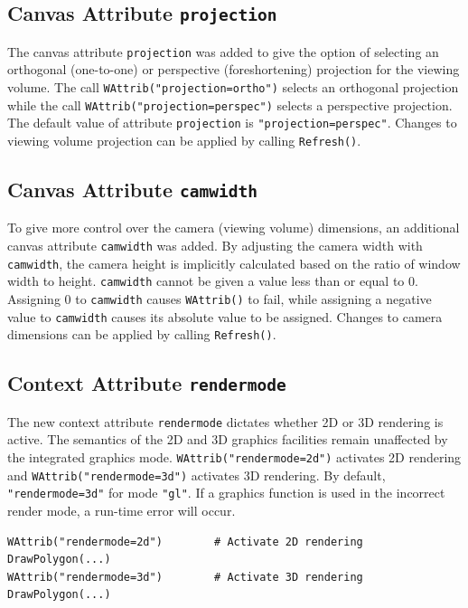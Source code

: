 \documentclass[letterpaper,12pt]{article}
\begin{document}
\subsection{Canvas Attribute \texttt{projection}}

The canvas attribute \texttt{projection} was added to give the option of
selecting an orthogonal (one-to-one) or perspective (foreshortening) projection 
for the viewing volume. The call
\texttt{WAttrib("projection=ortho")} selects an orthogonal projection while
the call \texttt{WAttrib("projection=perspec")} selects a perspective
projection. The default value of attribute \texttt{projection} is
\texttt{"projection=perspec"}. Changes to viewing volume
projection can be applied by calling \texttt{Refresh()}.

\subsection{Canvas Attribute \texttt{camwidth}}

To give more control over the camera (viewing volume) dimensions, an additional 
canvas attribute \texttt{camwidth} was added. By adjusting the
camera width with \texttt{camwidth}, the camera height is implicitly
calculated based on the ratio of window width to height. \texttt{camwidth}
cannot be given a value less than or equal to 0. Assigning 0 to 
\texttt{camwidth} causes \texttt{WAttrib()} to fail, while assigning a negative
value to \texttt{camwidth} causes its absolute value to be assigned.
Changes to camera dimensions can be applied by calling \texttt{Refresh()}.

\subsection{Context Attribute \texttt{rendermode}}

The new context attribute \texttt{rendermode} dictates whether 2D or 3D 
rendering is active. The semantics of the 2D and 3D graphics facilities 
remain unaffected by the integrated graphics mode. 
\texttt{WAttrib("rendermode=2d")} activates 2D rendering
and \texttt{WAttrib("rendermode=3d")} activates 3D rendering. By default, 
\texttt{"rendermode=3d"} for mode \texttt{"gl"}. If a graphics function is 
used in the incorrect render mode, a run-time error will occur. 

\begin{verbatim}
WAttrib("rendermode=2d")        # Activate 2D rendering
DrawPolygon(...)
WAttrib("rendermode=3d")        # Activate 3D rendering
DrawPolygon(...)
\end{verbatim}
\end{document}
